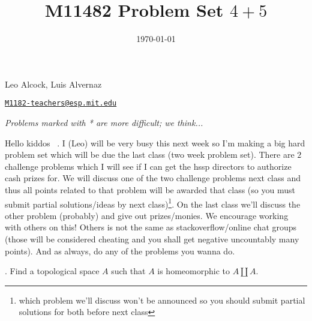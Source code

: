 \documentclass[12pt]{amsart}
\title{M11482 Problem Set $4 + 5$}%
\date{\today}
\theoremstyle{definition}
\theoremstyle{remark}
\begin{document}
\maketitle

\vspace*{-0.25in}
\centerline{Leo Alcock, Luis Alvernaz}
\centerline{\href{mailto:M11482-teachers@esp.mit.edu}{{\tt M1182-teachers@esp.mit.edu}}}
\vspace*{0.15in}
\centerline{{\it Problems marked with * are more difficult; we think...}}
\vspace*{0.25in}

Hello kiddos ~. I (Leo) will be very busy this next week so I'm making a big hard problem set which will be due the last class (two week problem set). There are $2$ challenge problems which I will see if I can get the hssp directors to authorize cash prizes for. We will discuss one of the two challenge problems next class and thus all points related to that problem will be awarded that class (so you must submit partial solutions/ideas by next class)\footnote{which problem we'll discuss won't be announced so you should submit partial solutions for both before next class}. On
the last class we'll discuss the other problem (probably) and give out prizes/monies. We encourage working with others on this! Others is not the same as stackoverflow/online chat groups (those will be considered cheating and you shall get negative uncountably many points). And as always, do any of the problems you wanna do. 




\medskip


\medskip


\medskip


\medskip

. Find a topological space $A$ such that $A$ is homeomorphic to $A\coprod A$.
\end{document}
